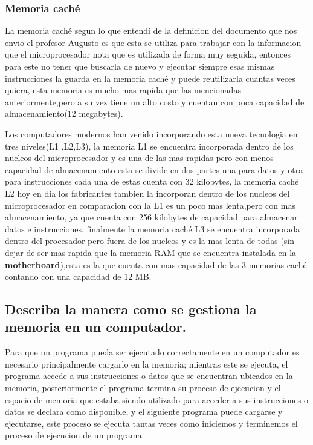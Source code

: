 \documentclass{article}
\begin{document}
\subsubsection{Memoria caché}
\noindent
La memoria caché segun lo que entendí de la definicion del documento que nos envio el profesor Augusto \cite{Augusto} es que esta se utiliza para trabajar con la informacion que el microprocesador nota que es utilizada de forma muy seguida, entonces para este no tener que buscarla de nuevo y ejecutar siempre esas mismas instrucciones la guarda en la memoria caché y puede reutilizarla cuantas veces quiera, esta memoria es mucho mas rapida que las mencionadas anteriormente,pero a su vez tiene un alto costo y cuentan con poca capacidad de almacenamiento(12 megabytes).

\vspace{0.3cm}
\noindent
Los computadores modernos han venido incorporando esta nueva tecnologia en tres niveles(L1 ,L2,L3), la memoria L1 se encuentra incorporada dentro de los nucleos del microprocesador y es una de las mas rapidas pero con menos capacidad de almacenamiento esta se divide en dos partes una para datos y otra para instrucciones cada una de estas cuenta con 32 kilobytes, la memoria caché L2 hoy en dia los fabricantes tambien la incorporan dentro de los nucleos del microprocesador en comparacion con la L1 es un poco mas lenta,pero con mas almacenamiento, ya que cuenta con 256 kilobytes de capacidad para almacenar datos e instrucciones, finalmente la memoria caché L3 se encuentra incorporada dentro del procesador pero fuera de los nucleos y es la mas lenta de todas (sin dejar de ser mas rapida que la memoria RAM que se encuentra instalada en la \textbf{motherboard}),esta es la que cuenta con mas capacidad de las 3 memorias caché contando con una capacidad de 12 MB. 

\subsection{Describa la manera como se gestiona la memoria en un computador.}
\noindent
Para que un programa pueda ser ejecutado correctamente en un computador es necesario principalmente cargarlo en la memoria; mientras este se  ejecuta, el programa accede a sus instrucciones o datos que se encuentran ubicados en la memoria, posteriormente el programa termina su proceso de ejecucion y el espacio de memoria que estaba siendo utilizado para acceder a sus instrucciones o datos se declara como disponible, y el siguiente programa puede cargarse y ejecutarse, este proceso se ejecuta tantas veces como iniciemos y terminemos el proceso de ejecucion de un programa.\cite{sites.google}
\end{document}
